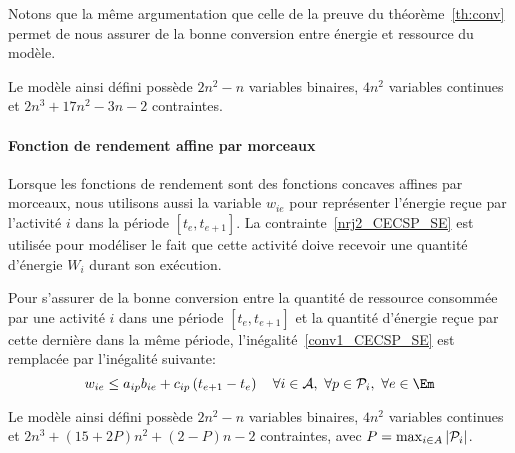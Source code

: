 Notons que la même argumentation que celle de la preuve du
théorème~\ref{th:conv} permet de nous assurer de la bonne conversion
entre énergie et ressource du modèle. 

Le modèle ainsi défini possède $2n^2-n$ variables binaires, $4n^2$
variables continues et $2n^3+17n^2-3n-2$ contraintes.

\paragraph{Fonction de rendement affine par morceaux}

Lorsque les fonctions de rendement sont des fonctions concaves
affines par morceaux, nous utilisons aussi la variable $w_{ie}$ pour
représenter l'énergie reçue par l'activité $i$ dans la période
$[t_e,t_{e+1}]$. La contrainte~\eqref{nrj2_CECSP_SE} est utilisée pour
modéliser le fait que cette activité doive recevoir une quantité
d'énergie $W_i$ durant son exécution.

Pour s'assurer de la bonne conversion entre la quantité de ressource
consommée par une activité $i$ dans une période $[t_e,t_{e+1}]$ et la
quantité d'énergie reçue par cette dernière dans la même période,
l'inégalité~\eqref{conv1_CECSP_SE} est remplacée par l'inégalité
suivante:
\begin{equation}
w_{ie} \le a_{ip}b_{ie} + c_{ip}\left( t_{e+1} - t_e\right) \quad  
\forall i \in \A,\ \forall p \in \P_i,\ \forall e \in \Em
\label{conv2_CECSP_SE}
\end{equation}

Le modèle ainsi défini possède $2n^2-n$ variables binaires, $4n^2$
variables continues et $2n^3+(15 + 2P)n^2+\left(2-P\right)n-2$
contraintes, avec $P=\max_{i\in A}|\P_i|$.    
